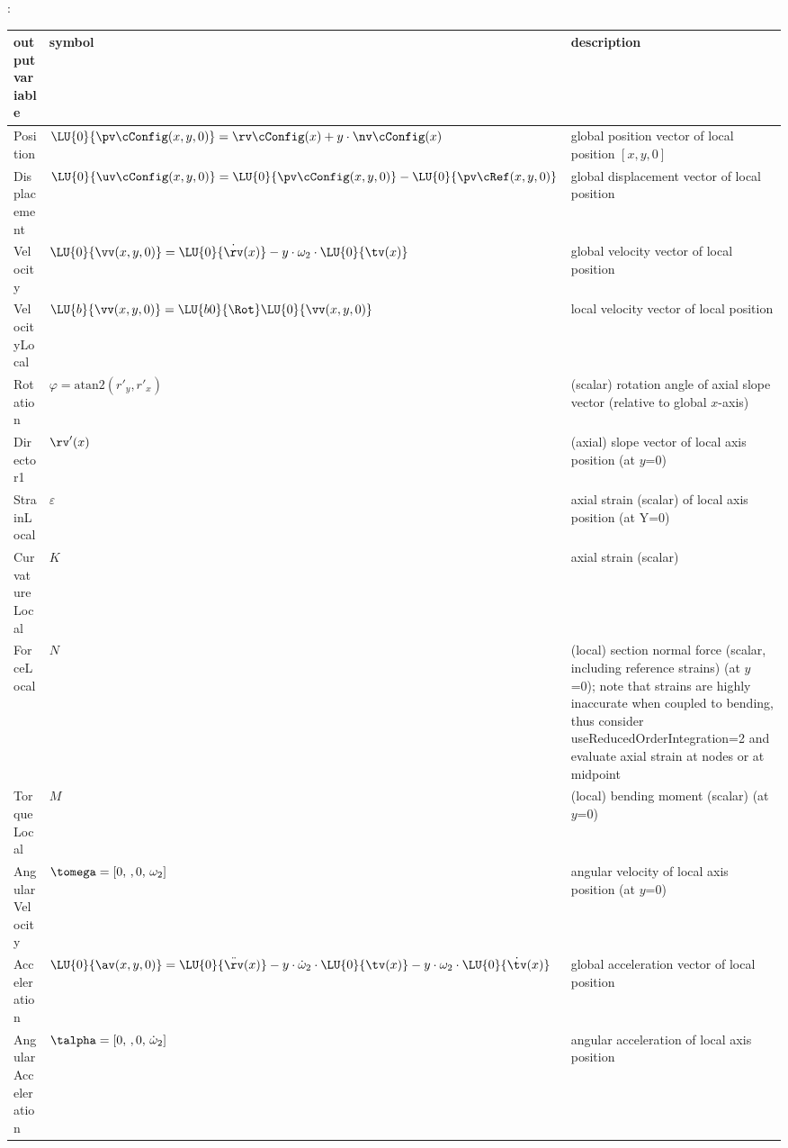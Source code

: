 :
\begin{center}
\footnotesize
\begin{longtable}{| p{5cm} | p{5cm} | p{6cm} |} 
\hline
\bf output variable & \bf symbol & \bf description \\ \hline
Position & $\LU{0}{\pv\cConfig(x,y,0)} = \rv\cConfig(x) + y\cdot \nv\cConfig(x)$ & global position vector of local position $[x,y,0]$\\ \hline
Displacement & $\LU{0}{\uv\cConfig(x,y,0)} = \LU{0}{\pv\cConfig(x,y,0)} - \LU{0}{\pv\cRef(x,y,0)}$ & global displacement vector of local position\\ \hline
Velocity & $\LU{0}{\vv(x,y,0)} = \LU{0}{\dot \rv(x)} - y \cdot \omega_2 \cdot\LU{0}{\tv(x)} $ & global velocity vector of local position\\ \hline
VelocityLocal & $\LU{b}{\vv(x,y,0)} = \LU{b0}{\Rot}\LU{0}{\vv(x,y,0)}$ & local velocity vector of local position\\ \hline
Rotation & $\varphi = \mathrm{atan2}(r'_y, r'_x)$ & (scalar) rotation angle of axial slope vector (relative to global $x$-axis)\\ \hline
Director1 & $\rv'(x)$ & (axial) slope vector of local axis position (at $y$=0)\\ \hline
StrainLocal & $\varepsilon$ & axial strain (scalar) of local axis position (at Y=0)\\ \hline
CurvatureLocal & $K$ & axial strain (scalar)\\ \hline
ForceLocal & $N$ &  (local) section normal force (scalar, including reference strains) (at $y$=0); note that strains are highly inaccurate when coupled to bending, thus consider useReducedOrderIntegration=2 and evaluate axial strain at nodes or at midpoint\\ \hline
TorqueLocal & $M$ &  (local) bending moment (scalar) (at $y$=0)\\ \hline
AngularVelocity & $\tomega = [0,\, ,0,\, \omega_2]$ & angular velocity of local axis position (at $y$=0)\\ \hline
Acceleration & $\LU{0}{\av(x,y,0)} = \LU{0}{\ddot \rv(x)} - y \cdot \dot\omega_2 \cdot\LU{0}{\tv(x)}- y \cdot \omega_2 \cdot\LU{0}{\dot\tv(x)} $ & global acceleration vector of local position\\ \hline
AngularAcceleration & $\talpha = [0,\, ,0,\, \dot\omega_2]$ & angular acceleration of local axis position\\ \hline
\end{longtable}
\end{center}

